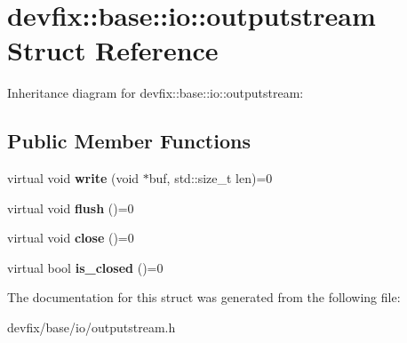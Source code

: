 \hypertarget{structdevfix_1_1base_1_1io_1_1outputstream}{}\section{devfix\+:\+:base\+:\+:io\+:\+:outputstream Struct Reference}
\label{structdevfix_1_1base_1_1io_1_1outputstream}


Inheritance diagram for devfix\+:\+:base\+:\+:io\+:\+:outputstream\+:
\subsection*{Public Member Functions}
\begin{DoxyCompactItemize}
\item 
\mbox{\label{structdevfix_1_1base_1_1io_1_1outputstream_ab2e54837f6882c17d77c5be078219a1c}} 
virtual void {\bfseries write} (void $\ast$buf, std\+::size\+\_\+t len)=0
\item 
\mbox{\label{structdevfix_1_1base_1_1io_1_1outputstream_a3fe3b34675a2d70331e6ca235388e0cc}} 
virtual void {\bfseries flush} ()=0
\item 
\mbox{\label{structdevfix_1_1base_1_1io_1_1outputstream_a060c2e7040e6bb831b8150f64bd8abf7}} 
virtual void {\bfseries close} ()=0
\item 
\mbox{\label{structdevfix_1_1base_1_1io_1_1outputstream_a52bd2eac8f6fbc496eab5138a48d2f06}} 
virtual bool {\bfseries is\+\_\+closed} ()=0
\end{DoxyCompactItemize}


The documentation for this struct was generated from the following file\+:\begin{DoxyCompactItemize}
\item 
devfix/base/io/outputstream.\+h\end{DoxyCompactItemize}
